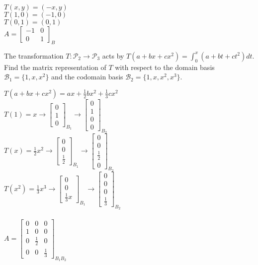 	\begin{solution}
		$T(x,y) = (-x,y)$
		\\
		$T(1,0) = (-1,0)$
		\\
		$T(0,1) = (0,1)$
		\\
		$A = 
		\begin{bmatrix}-1 & 0 \\ 0 & 1 \end{bmatrix}_B$
	\end{solution}
	
	\item The transformation $T\colon \mathcal{P}_2 \to \mathcal{P}_3$ acts by
	$T(a+bx+cx^2) = \int_0^x (a+bt+ct^2) dt$. Find the matrix representation of $T$ with respect to the domain basis $\mathcal{B}_1 = \{ 1, x, x^2 \}$ and the codomain basis $\mathcal{B}_2 = \{ 1, x, x^2, x^3 \}$.
	
	\begin{solution}
	$T(a+bx+cx^2) = ax+ \frac{1}{2} bx^2 + \frac{1}{3} cx^2$
	\\
	$T(1) = x \to \begin{bmatrix}0 \\ 1 \\ 0 \end{bmatrix}_{B_1} \to \begin{bmatrix} 0 \\ 1 \\ 0  \\ 0 \end{bmatrix}_{B_2}$
	\\
	$T(x) = \frac{1}{2}x^2\to \begin{bmatrix}0 \\ 0 \\ \frac{1}{2} \end{bmatrix}_{B_1} \to \begin{bmatrix}0 \\ 0 \\ \frac{1}{2} \\ 0\end{bmatrix}_{B_2}$
	\\
	$T(x^2) = \frac{1}{3}x^3\to \begin{bmatrix}0 \\ 0 \\ \frac{1}{3}x \end{bmatrix}_{B_1}\to \begin{bmatrix}0 \\ 0 \\ 0  \\ \frac{1}{3} \end{bmatrix}_{B_2}$
	 \\
	 \\
	 $A  = \begin{bmatrix}
	 0 & 0 & 0 \\
	 1 & 0 & 0 \\
	 0 & \frac{1}{2} & 0 \\
	 0 & 0 & \frac{1}{3}
	 \end{bmatrix}_{B_1B_2}$
	
	
	\end{solution}
	
